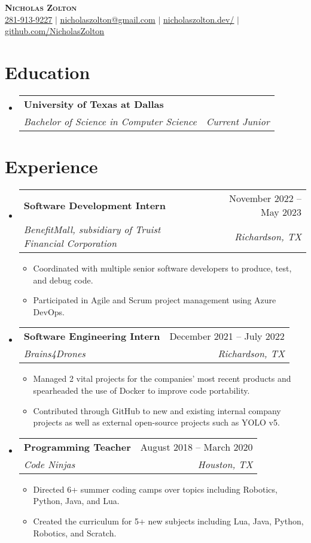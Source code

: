\documentclass[11pt,letterpaper]{article}%
\makeatletter
\newcommand{\resumeItem}[1]{
  \item\small{
    {#1 \vspace{-2pt}}
  }
}
\newcommand{\resumeSubheading}[4]{
  \vspace{-2pt}\item
    \begin{tabular*}{0.97\textwidth}[t]{l@{\extracolsep{\fill}}r}
      \textbf{#1} & #2 \\
      \textit{\small#3} & \textit{\small #4} \\
    \end{tabular*}\vspace{-7pt}
}
\newcommand{\resumeSubHeadingListStart}{\begin{itemize}[leftmargin=0.15in, label={}]}
\newcommand{\resumeSubHeadingListEnd}{\end{itemize}}
\newcommand{\resumeItemListStart}{\begin{itemize}}
\newcommand{\resumeItemListEnd}{\end{itemize}\vspace{-5pt}}
\makeatother
\begin{document}
%
\normalsize%
\begin{center}
%
    \textbf{\Huge \scshape Nicholas Zolton} \\ \vspace{1pt}
%
    \small \href{tel:281{-}913{-}9227}{\underline{281{-}913{-}9227}} $|$ 
%
    \small \href{mailto:nicholaszolton@gmail.com}{\underline{nicholaszolton@gmail.com}} $|$ 
%
\small \href{https://nicholaszolton.dev/}{\underline{nicholaszolton.dev/}} $|$ 
%
\small \href{https://github.com/NicholasZolton}{\underline{github.com/NicholasZolton}}
%
\end{center}
%
%
\section{Education}
%
\resumeSubHeadingListStart
%
\resumeSubheading
%
{University of Texas at Dallas}{}
%
{Bachelor of Science in Computer Science}{Current Junior}
%
\resumeSubHeadingListEnd
%
%
\section{Experience}
%
  \resumeSubHeadingListStart
%
    \resumeSubheading
%
      {Software Development Intern}{November 2022 – May 2023}
%
      {BenefitMall, subsidiary of Truist Financial Corporation}{Richardson, TX}
%
      \resumeItemListStart
%
        \resumeItem{Coordinated with multiple senior software developers to produce, test, and debug code.}
%
        \resumeItem{Participated in Agile and Scrum project management using Azure DevOps.}
%
      \resumeItemListEnd
%
    \resumeSubheading
%
      {Software Engineering Intern}{December 2021 – July 2022}
%
      {Brains4Drones}{Richardson, TX}
%
      \resumeItemListStart
%
        \resumeItem{Managed 2 vital projects for the companies' most recent products and spearheaded the use of Docker to improve code portability.}
%
        \resumeItem{Contributed through GitHub to new and existing internal company projects as well as external open{-}source projects such as YOLO v5.}
%
      \resumeItemListEnd
%
    \resumeSubheading
%
      {Programming Teacher}{August 2018 – March 2020}
%
      {Code Ninjas}{Houston, TX}
%
      \resumeItemListStart
%
        \resumeItem{Directed 6+ summer coding camps over topics including Robotics, Python, Java, and Lua.}
%
        \resumeItem{Created the curriculum for 5+ new subjects including Lua, Java, Python, Robotics, and Scratch.}
%
      \resumeItemListEnd
%
  \resumeSubHeadingListEnd
%
%
\end{document}
